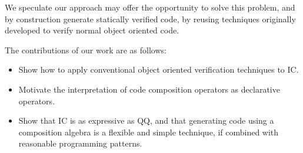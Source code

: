 We speculate our approach may offer the opportunity to solve this problem,
and by construction generate statically verified code,
by reusing techniques originally developed to verify normal object oriented code.


The contributions of our work are as follows:
\begin{itemize}
\item
Show how to apply conventional object oriented verification techniques to IC.
\item
Motivate the interpretation of code composition operators as declarative operators.
\item
Show that IC is as expressive as QQ, and that
generating code using a composition algebra
is a flexible and simple technique, if combined with
reasonable programming patterns.
\end{itemize}



